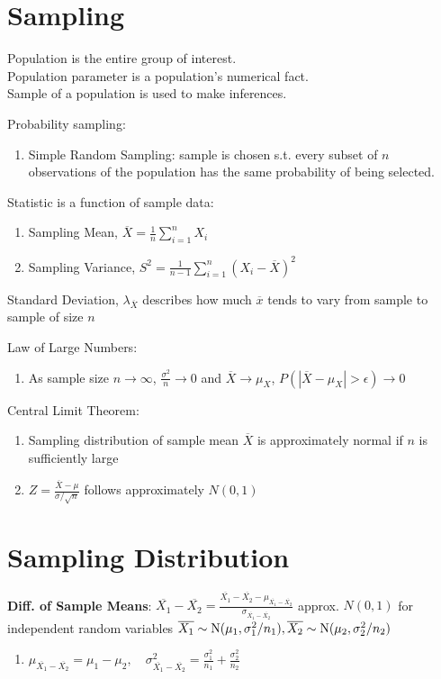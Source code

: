 \documentclass[12pt, a4paper]{article}
\begin{document}
\begin{multicols*}{3}
\colbreak
\section{Sampling}

Population is the entire group of interest.\\ Population parameter is a population's numerical fact.\\Sample of a population is used to make inferences. 

Probability sampling:
\begin{enumerate}[\roman*.]
  \item Simple Random Sampling: sample is chosen s.t. every subset of $n$ observations of the population has the same probability of being selected.
\end{enumerate}

Statistic is a function of sample data:
\begin{enumerate}[\roman*.]
  \item Sampling Mean, $\overline{X} = \frac{1}{n}\sum^n_{i=1}X_i$
  \item Sampling Variance, $S^2 = \frac{1}{n-1} \sum^n_{i=1}(X_i-\overline{X})^2$
\end{enumerate}

Standard Deviation, $\lambda_{\overline{X}}$ describes how much $\overline{x}$ tends to vary from sample to sample of size $n$

Law of Large Numbers: 
\begin{enumerate}[\roman*.]
  \item As sample size $n\rightarrow\infty$, $\frac{\sigma^2}{n}\rightarrow 0$ and $\overline{X} \rightarrow\mu_X$, $P(|\overline{X}-\mu_X| > \epsilon) \rightarrow 0$
\end{enumerate}

Central Limit Theorem:
\begin{enumerate}[\roman*.]
  \item Sampling distribution of sample mean $\overline{X}$ is approximately normal if $n$ is sufficiently large 
  \item $Z = \frac{\overline{X}-\mu}{\sigma / \sqrt{n}}$ follows approximately $N(0, 1)$
\end{enumerate}

\colbreak
\section{Sampling Distribution}
\textbf{Diff. of Sample Means}: $\overline{X_1} - \overline{X_2} = \frac{\overline{X_1}-\overline{X_2} - \mu_{\overline{X_1}-\overline{X_2}}}{\sigma_{\overline{X_1}-\overline{X_2}}}$ approx. $N(0, 1)$ for independent random variables $\overline{X_1}\sim \text{N}(\mu_1, \sigma_1^2 /n_1), \overline{X_2}\sim\text{N}(\mu_2, \sigma_2^2 /n_2)$
\begin{enumerate}[\roman*.]
  \item $\mu_{\overline{X_1}-\overline{X_2}} = \mu_1 - \mu_2,\quad \sigma^2_{\overline{X_1}-\overline{X_2}} = \frac{\sigma_1^2}{n_1}+\frac{\sigma_2^2}{n_2}$
\end{enumerate}


\end{multicols*}
\end{document}
